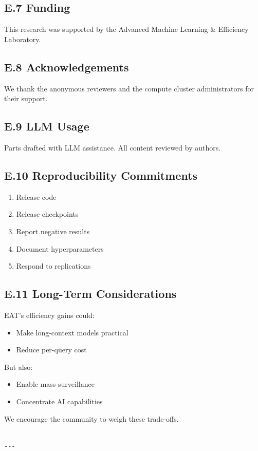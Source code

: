 \subsection{E.7 Funding}

This research was supported by the Advanced Machine Learning \& Efficiency Laboratory.

\subsection{E.8 Acknowledgements}

We thank the anonymous reviewers and the compute cluster administrators for their support.

\subsection{E.9 LLM Usage}

Parts drafted with LLM assistance. All content reviewed by authors.

\subsection{E.10 Reproducibility Commitments}

\begin{enumerate}
\item Release code
\item Release checkpoints
\item Report negative results
\item Document hyperparameters
\item Respond to replications

\end{enumerate}
\subsection{E.11 Long-Term Considerations}

EAT's efficiency gains could:

\begin{itemize}
\item Make long-context models practical
\item Reduce per-query cost

\end{itemize}
But also:

\begin{itemize}
\item Enable mass surveillance
\item Concentrate AI capabilities

\end{itemize}
We encourage the community to weigh these trade-offs.
\begin{lstlisting}

---
\end{lstlisting}
